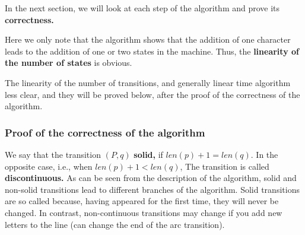 In the next section, we will look at each step of the algorithm and prove its \textbf{correctness.}

Here we only note that the algorithm shows that the addition of one character leads to the addition of one or two states in the machine. Thus, the \textbf{linearity of the number of states} is obvious.

The linearity of the number of transitions, and generally linear time algorithm less clear, and they will be proved below, after the proof of the correctness of the algorithm.

\subsubsection{ Proof of the correctness of the algorithm }

We say that the transition $(P, q)$ \textbf{solid,} if $len (p) + 1 = len (q)$. In the opposite case, i.e., when $len (p) + 1 <len (q)$, The transition is called \textbf{discontinuous.}
As can be seen from the description of the algorithm, solid and non-solid transitions lead to different branches of the algorithm. Solid transitions are so called because, having appeared for the first time, they will never be changed. In contrast, non-continuous transitions may change if you add new letters to the line (can change the end of the arc transition).

